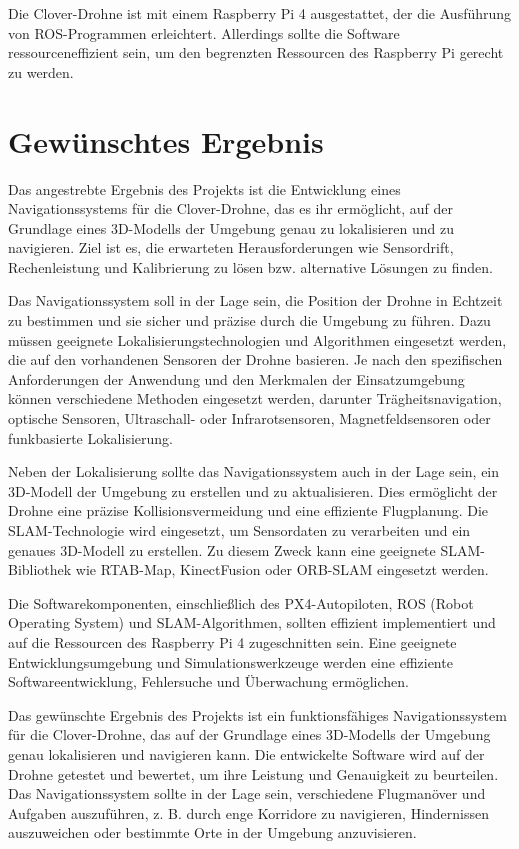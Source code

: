 Die Clover-Drohne ist mit einem Raspberry Pi 4 ausgestattet, der die Ausführung von ROS-Programmen erleichtert. Allerdings sollte die Software ressourceneffizient sein, um den begrenzten Ressourcen des Raspberry Pi gerecht zu werden.

\section{Gewünschtes Ergebnis} \label{gewuenschtes_ergebnis:section} 

Das angestrebte Ergebnis des Projekts ist die Entwicklung eines Navigationssystems für die Clover-Drohne, das es ihr ermöglicht, auf der Grundlage eines 3D-Modells der Umgebung genau zu lokalisieren und zu navigieren. Ziel ist es, die erwarteten Herausforderungen wie Sensordrift, Rechenleistung und Kalibrierung zu lösen bzw. alternative Lösungen zu finden.

Das Navigationssystem soll in der Lage sein, die Position der Drohne in Echtzeit zu bestimmen und sie sicher und präzise durch die Umgebung zu führen. Dazu müssen geeignete Lokalisierungstechnologien und Algorithmen eingesetzt werden, die auf den vorhandenen Sensoren der Drohne basieren. Je nach den spezifischen Anforderungen der Anwendung und den Merkmalen der Einsatzumgebung können verschiedene Methoden eingesetzt werden, darunter Trägheitsnavigation, optische Sensoren, Ultraschall- oder Infrarotsensoren, Magnetfeldsensoren oder funkbasierte Lokalisierung.

Neben der Lokalisierung sollte das Navigationssystem auch in der Lage sein, ein 3D-Modell der Umgebung zu erstellen und zu aktualisieren. Dies ermöglicht der Drohne eine präzise Kollisionsvermeidung und eine effiziente Flugplanung. Die \ac{SLAM}-Technologie wird eingesetzt, um Sensordaten zu verarbeiten und ein genaues 3D-Modell zu erstellen. Zu diesem Zweck kann eine geeignete SLAM-Bibliothek wie RTAB-Map, KinectFusion oder ORB-SLAM eingesetzt werden.

Die Softwarekomponenten, einschließlich des PX4-Autopiloten, ROS (Robot Operating System) und SLAM-Algorithmen, sollten effizient implementiert und auf die Ressourcen des Raspberry Pi 4 zugeschnitten sein. Eine geeignete Entwicklungsumgebung und Simulationswerkzeuge werden eine effiziente Softwareentwicklung, Fehlersuche und Überwachung ermöglichen.

Das gewünschte Ergebnis des Projekts ist ein funktionsfähiges Navigationssystem für die Clover-Drohne, das auf der Grundlage eines 3D-Modells der Umgebung genau lokalisieren und navigieren kann. Die entwickelte Software wird auf der Drohne getestet und bewertet, um ihre Leistung und Genauigkeit zu beurteilen. Das Navigationssystem sollte in der Lage sein, verschiedene Flugmanöver und Aufgaben auszuführen, z. B. durch enge Korridore zu navigieren, Hindernissen auszuweichen oder bestimmte Orte in der Umgebung anzuvisieren.

